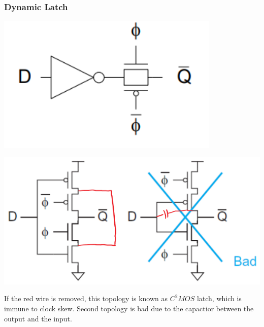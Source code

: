 \documentclass[11pt]{article}
\begin{document}
\subsubsection*{Dynamic Latch}
\begin{multicols}{2}
    \begin{minipage}{0.9\linewidth}
        \begin{center}
            \includegraphics[width=0.8\textwidth]{dynamic_latch.png}
        \end{center}
    \end{minipage}
    \begin{minipage}{\linewidth}
        \begin{center}
            \includegraphics[scale=0.6]{latch2.png}
        \end{center}
    \end{minipage}
\end{multicols}
\noindent
If the red wire is removed, this topology is known as $C^2MOS$ latch, which is immune to clock skew. Second topology is bad due to the capactior between the output and the input.
\end{document}
